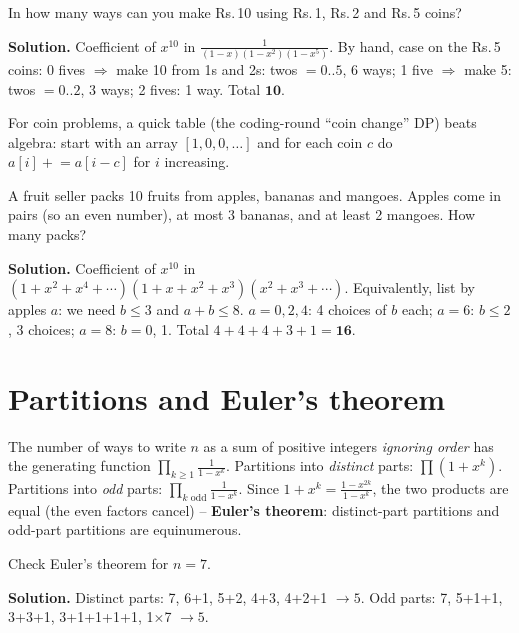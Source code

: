 \documentclass[11pt,a4paper,openany]{report}
\newcommand{\Rs}{Rs.\,}
\begin{document}
\begin{example}[coins]
In how many ways can you make \Rs10 using \Rs1, \Rs2 and \Rs5 coins?

\textbf{Solution.} Coefficient of $x^{10}$ in $\frac1{(1-x)(1-x^2)(1-x^5)}$. By hand, case on the \Rs5 coins:
0 fives $\Rightarrow$ make 10 from 1s and 2s: twos $=0..5$, 6 ways; 1 five $\Rightarrow$ make 5: twos $=0..2$, 3 ways;
2 fives: 1 way. Total $\mathbf{10}$.
\end{example}

\begin{shortcut}
For coin problems, a quick table (the coding-round ``coin change'' DP) beats algebra: start with an array
$[1,0,0,\dots]$ and for each coin $c$ do $a[i]\mathrel{+}=a[i-c]$ for $i$ increasing.
\end{shortcut}

\begin{example}
A fruit seller packs 10 fruits from apples, bananas and mangoes. Apples come in pairs (so an even number),
at most 3 bananas, and at least 2 mangoes. How many packs?

\textbf{Solution.} Coefficient of $x^{10}$ in $(1+x^2+x^4+\cdots)(1+x+x^2+x^3)(x^2+x^3+\cdots)$.
Equivalently, list by apples $a$: we need $b\le3$ and $a+b\le8$. $a=0,2,4$: 4 choices of $b$ each; $a=6$: $b\le2$, 3 choices; $a=8$: $b=0$, 1.
Total $4+4+4+3+1=\mathbf{16}$.
\end{example}

\section{Partitions and Euler's theorem}
The number of ways to write $n$ as a sum of positive integers \emph{ignoring order} has the generating function
$\prod_{k\ge1}\frac1{1-x^k}$. Partitions into \emph{distinct} parts: $\prod(1+x^k)$. Partitions into \emph{odd} parts:
$\prod_{k\text{ odd}}\frac1{1-x^k}$. Since $1+x^k=\frac{1-x^{2k}}{1-x^k}$, the two products are equal (the even
factors cancel) -- \textbf{Euler's theorem}: distinct-part partitions and odd-part partitions are equinumerous.

\begin{example}
Check Euler's theorem for $n=7$.

\textbf{Solution.} Distinct parts: 7, 6+1, 5+2, 4+3, 4+2+1 $\to5$. Odd parts: 7, 5+1+1, 3+3+1, 3+1+1+1+1, 1$\times$7 $\to5$. \checkmark
\end{example}
\end{document}
